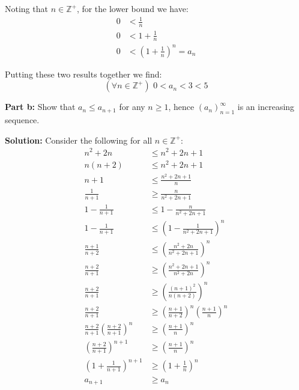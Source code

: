 \documentclass{article}
\newcommand{\Z}{\mathbb Z}
\begin{document}
Noting that $n\in\Z^+$, for the lower bound we have:
\begin{align*}
  0&<\frac{1}{n}\tag{multiplicative inverse of a positive number is positive}\\
  0&<1+\frac{1}{n}\tag{1 plus positive number is positive}\\
  0&<\left(1+\frac{1}{n}\right)^n=a_n\tag{positive powers of positive numbers are positive}
\end{align*}

Putting these two results together we find:
\begin{equation*}
  (\forall n\in\Z^+)\,\,0<a_n<3<5
\end{equation*}
\newpage

\noindent\textbf{Part b:} Show that $a_n\le a_{n+1}$ for any $n\ge 1$, hence $(a_n)_{n=1}^\infty$ is an increasing sequence.
\bigskip

\noindent\textbf{Solution:} Consider the following for all $n\in\Z^+$:
\begin{align*}
  n^2+2n&\le n^2+2n+1\tag{$n>0$}\\
  n(n+2)&\le n^2+2n+1\\
  n+1&\le \frac{n^2+2n+1}{n}\tag{divide both sides by positive number}\\
  \frac{1}{n+1}&\ge \frac{n}{n^2+2n+1}\tag{inverse both (positive) sides of inequality}\\
  1-\frac{1}{n+1}&\le1-\frac{n}{n^2+2n+1}\tag{negate both sides of inequality}\\
  1-\frac{1}{n+1}&\le\left(1-\frac{1}{n^2+2n+1}\right)^n\tag{Bernoulli's inequality}\\
  \frac{n+1}{n+2}&\le\left(\frac{n^2+2n}{n^2+2n+1}\right)^n\\
  \frac{n+2}{n+1}&\ge\left(\frac{n^2+2n+1}{n^2+2n}\right)^n\tag{inverse both (positive) sides of inequality}\\
  \frac{n+2}{n+1}&\ge\left(\frac{(n+1)^2}{n(n+2)}\right)^n\\
  \frac{n+2}{n+1}&\ge\left(\frac{n+1}{n+2}\right)^n\left(\frac{n+1}{n}\right)^n\\
  \frac{n+2}{n+1}\left(\frac{n+2}{n+1}\right)^n&\ge\left(\frac{n+1}{n}\right)^n\tag{divide both sides by positive number}\\
  \left(\frac{n+2}{n+1}\right)^{n+1}&\ge\left(\frac{n+1}{n}\right)^n\\
  \left(1+\frac{1}{n+1}\right)^{n+1}&\ge\left(1+\frac{1}{n}\right)^n\\
  a_{n+1}&\ge a_n\tag{def. of $a_n$}\\
\end{align*}
\end{document}

